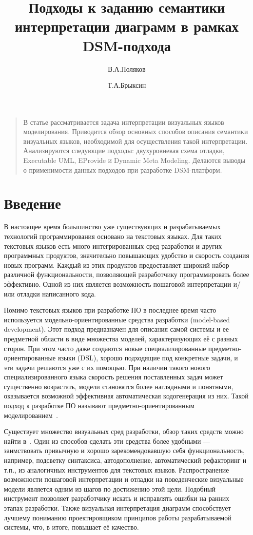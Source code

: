 \documentclass[a5paper]{article}
\title{Подходы к заданию семантики интерпретации диаграмм в рамках DSM-подхода}
\author{В.А.Поляков \and Т.А.Брыксин}
\date{}
\begin{document}
\maketitle
\thispagestyle{empty}

\begin{quote}
\small\noindent
В статье рассматривается задача интерпретации визуальных языков моделирования. Приводится обзор основных способов описания семантики визуальных языков, необходимой для осуществления такой интерпретации. Анализируются следующие подходы: двухуровневая схема отладки, Executable UML, EProvide и Dynamic Meta Modeling. Делаются выводы о применимости данных подходов при разработке DSM-платформ.
\end{quote}

\section*{Введение}

В настоящее время большинство уже существующих и разрабатываемых технологий программирования основано на текстовых языках. Для таких текстовых языков есть много интегрированных сред разработки и других программных продуктов, значительно повышающих удобство и скорость создания новых программ. Каждый из этих продуктов предоставляет широкий набор различной функциональности, позволяющей разработчику программировать более эффективно. Одной из них является возможность пошаговой интерпретации и/или отладки написанного кода.

Помимо текстовых языков при разработке ПО в последнее время часто используется модельно-ориентированные средства разработки (model-based development). Этот подход предназначен для описания самой системы и ее предметной области в виде множества моделей, характеризующих её с разных сторон. При этом часто даже создаются новые специализированные предметно-ориентированные языки (DSL), хорошо подходящие под конкретные задачи, и эти задачи решаются уже с их помощью. При наличии такого нового специализированного языка скорость решения поставленных задач может существенно возрастать, модели становятся более наглядными и понятными, оказывается возможной эффективная автоматическая кодогенерация из них. Такой подход к разработке ПО называют предметно-ориентированным моделированием~\cite{koznov1, koznov2, koznov4, koznov6, dsmbook}.

Существует множество визуальных сред разработки, обзор таких средств можно найти в~\cite{koznov3, koznov5}. Один из способов сделать эти средства более удобными --- заимствовать привычную и хорошо зарекомендовавшую себя функциональность, например, подсветку синтаксиса, автодополнение, автоматический рефакторинг и т.п., из аналогичных инструментов для текстовых языков. Распространение возможности пошаговой интерпретации и отладки на поведенческие визуальные модели является одним из шагов по достижению этой цели. Подобный инструмент позволяет разработчику искать и исправлять ошибки на ранних этапах разработки. Также визуальная интерпретация диаграмм способствует лучшему пониманию проектировщиком принципов работы разрабатываемой системы, что, в итоге, повышает её качество.
\end{document}
